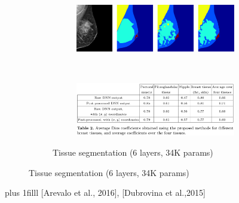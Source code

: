 \documentclass{beamer}
\newcommand{\source}[1]{\vskip0pt plus 1filll \scriptsize #1}
\begin{document}
\begin{frame}
\begin{figure}[h]
\begin{subfigure}{0.48\textwidth}
\begin{subfigure}{\textwidth}
				\end{subfigure}
				~
				\begin{subfigure}{\textwidth}
					\includegraphics[width=\textwidth]{plots/dubrovina2.png}
				\end{subfigure}
				~
				\begin{subfigure}{\textwidth}
					\includegraphics[width=\textwidth]{plots/dubrovinaResults.png}
				\end{subfigure}
				\caption{Tissue segmentation (6 layers, 34K params)}
			\end{subfigure}
		\end{figure}
		\source{[Arevalo et al., 2016], [Dubrovina et al.,2015]}
	\end{frame}
	
\end{document}
